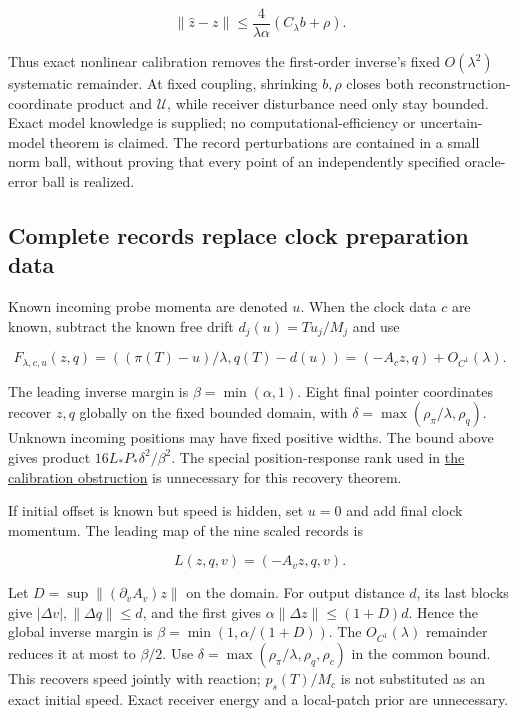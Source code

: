 \documentclass[11pt,a4paper]{article}
\begin{document}
\[\|\widehat z-z\|\le\frac4{\lambda\alpha}(C_\lambda b+\rho).\]

Thus exact nonlinear calibration removes the first-order inverse's fixed
\(O(\lambda^2)\) systematic remainder. At fixed coupling, shrinking
\(b,\rho\) closes both reconstruction-coordinate product and
\(\mathcal U\), while receiver disturbance need only stay bounded. Exact
model knowledge is supplied; no computational-efficiency or
uncertain-model theorem is claimed. The record perturbations are
contained in a small norm ball, without proving that every point of an
independently specified oracle-error ball is realized.

\hypertarget{complete-records-replace-clock-preparation-data}{%
\subsection{Complete records replace clock preparation
data}\label{complete-records-replace-clock-preparation-data}}

Known incoming probe momenta are denoted \(u\). When the clock data
\(c\) are known, subtract the known free drift \(d_j(u)=Tu_j/M_j\) and
use

\[F_{\lambda,c,u}(z,q)=((\pi(T)-u)/\lambda,q(T)-d(u))
 =(-A_cz,q)+O_{C^1}(\lambda).\]

The leading inverse margin is \(\beta=\min(\alpha,1)\). Eight final
pointer coordinates recover \(z,q\) globally on the fixed bounded
domain, with \(\delta=\max(\rho_\pi/\lambda,\rho_q)\). Unknown incoming
positions may have fixed positive widths. The bound above gives product
\(16L_*P_*\delta^2/\beta^2\). The special position-response rank used in
\href{calibration-tolerance-recovery.md\#incomplete-records-and-preparation-width}{the
calibration obstruction} is unnecessary for this recovery theorem.

If initial offset is known but speed is hidden, set \(u=0\) and add
final clock momentum. The leading map of the nine scaled records is

\[L(z,q,v)=(-A_vz,q,v).\]

Let \(D=\sup\|(\partial_v A_v)z\|\) on the domain. For output distance
\(d\), its last blocks give \(|\Delta v|,\|\Delta q\|\le d\), and the
first gives \(\alpha\|\Delta z\|\le(1+D)d\). Hence the global inverse
margin is \(\beta=\min(1,\alpha/(1+D))\). The \(O_{C^1}(\lambda)\)
remainder reduces it at most to \(\beta/2\). Use
\(\delta=\max(\rho_\pi/\lambda,\rho_q,\rho_c)\) in the common bound.
This recovers speed jointly with reaction; \(p_s(T)/M_c\) is not
substituted as an exact initial speed. Exact receiver energy and a
local-patch prior are unnecessary.
\end{document}
